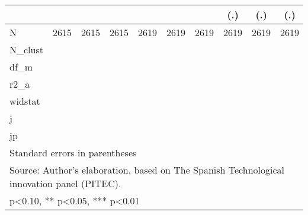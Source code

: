 \begin{table}[htbp]
\begin{tabular}{l*{9}{c}}
                    &               &               &               &               &               &               &         (.)   &         (.)   &         (.)   \\
\hline
N                   &        2615   &        2615   &        2615   &        2619   &        2619   &        2619   &        2619   &        2619   &        2619   \\
N\_clust             &               &               &               &               &               &               &               &               &               \\
df\_m                &               &               &               &               &               &               &               &               &               \\
r2\_a                &               &               &               &               &               &               &               &               &               \\
widstat             &               &               &               &               &               &               &               &               &               \\
j                   &               &               &               &               &               &               &               &               &               \\
jp                  &               &               &               &               &               &               &               &               &               \\
\hline\hline
\multicolumn{10}{l}{\footnotesize Standard errors in parentheses}\\
\multicolumn{10}{l}{\footnotesize Source: Author's elaboration, based on The Spanish Technological innovation panel (PITEC).}\\
\multicolumn{10}{l}{\footnotesize * p<0.10, ** p<0.05, *** p<0.01}\\
\end{tabular}
\end{table}
